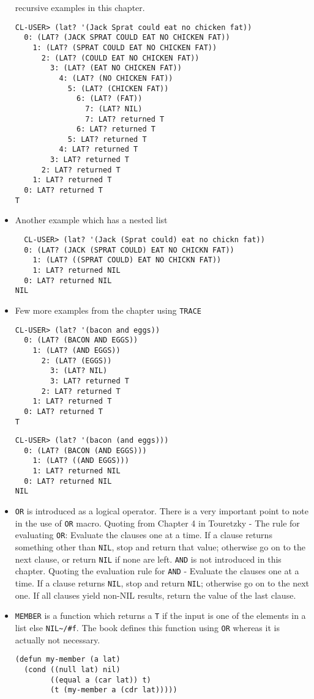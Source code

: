 \documentclass[11pt]{article}
\begin{document}
\begin{itemize}
recursive examples in this chapter.
\begin{verbatim}
CL-USER> (lat? '(Jack Sprat could eat no chicken fat))
  0: (LAT? (JACK SPRAT COULD EAT NO CHICKEN FAT))
    1: (LAT? (SPRAT COULD EAT NO CHICKEN FAT))
      2: (LAT? (COULD EAT NO CHICKEN FAT))
        3: (LAT? (EAT NO CHICKEN FAT))
          4: (LAT? (NO CHICKEN FAT))
            5: (LAT? (CHICKEN FAT))
              6: (LAT? (FAT))
                7: (LAT? NIL)
                7: LAT? returned T
              6: LAT? returned T
            5: LAT? returned T
          4: LAT? returned T
        3: LAT? returned T
      2: LAT? returned T
    1: LAT? returned T
  0: LAT? returned T
T
\end{verbatim}
\item Another example which has a nested list
\begin{verbatim}
  CL-USER> (lat? '(Jack (Sprat could) eat no chickn fat))
  0: (LAT? (JACK (SPRAT COULD) EAT NO CHICKN FAT))
    1: (LAT? ((SPRAT COULD) EAT NO CHICKN FAT))
    1: LAT? returned NIL
  0: LAT? returned NIL
NIL
\end{verbatim}
\item Few more examples from the chapter using \texttt{TRACE}
\begin{verbatim}
CL-USER> (lat? '(bacon and eggs))
  0: (LAT? (BACON AND EGGS))
    1: (LAT? (AND EGGS))
      2: (LAT? (EGGS))
        3: (LAT? NIL)
        3: LAT? returned T
      2: LAT? returned T
    1: LAT? returned T
  0: LAT? returned T
T
\end{verbatim}

\begin{verbatim}
CL-USER> (lat? '(bacon (and eggs)))
  0: (LAT? (BACON (AND EGGS)))
    1: (LAT? ((AND EGGS)))
    1: LAT? returned NIL
  0: LAT? returned NIL
NIL
\end{verbatim}
\item \texttt{OR} is introduced as a logical operator. There is a very important point to note in the use of \texttt{OR} macro. Quoting
from Chapter 4 in Touretzky - The rule for evaluating \texttt{OR}: Evaluate the clauses one at a time. If a clause
returns something other than \texttt{NIL}, stop and return that value; otherwise go on to the next clause, or return
\texttt{NIL} if none are left. \texttt{AND} is not introduced in this chapter. Quoting the evaluation rule for \texttt{AND} - Evaluate
the clauses one at a time. If a clause returns \texttt{NIL}, stop and return \texttt{NIL}; otherwise go on to the next one. If all
clauses yield non-NIL results, return the value of the last clause.
\item \texttt{MEMBER} is a function which returns a \texttt{T} if the input is one of the elements in a list else \texttt{NIL\textasciitilde{}/\#f}. The book
defines this function using \texttt{OR} whereas it is actually not necessary.
\begin{verbatim}
(defun my-member (a lat)
  (cond ((null lat) nil)
        ((equal a (car lat)) t)
        (t (my-member a (cdr lat)))))


\end{verbatim}
\end{itemize}
\end{document}
